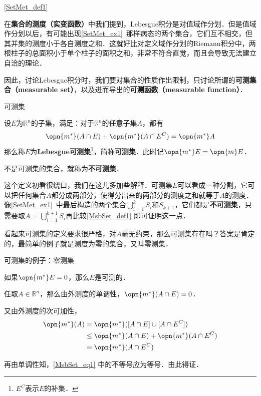 
\autoref{SetMet_def1} 

在\textbf{集合的测度（实变函数）}中我们提到，Lebesgue积分是对值域作分划．但是值域作分划以后，有可能出现\autoref{SetMet_ex1}~那样病态的两个集合，它们互不相交，但其并集的测度小于各自测度之和．这就好比对定义域作分划的Riemann积分中，两根柱子的总面积小于单个柱子的面积之和，非常不符合直觉，而且会导致无法建立自洽的理论．

因此，讨论Lebesgue积分时，我们要对集合的性质作出限制，只讨论所谓的\textbf{可测集合（measurable set）}，以及进而导出的\textbf{可测函数（measurable function）}．

\begin{definition}{可测集}\label{MsbSet_def1}

设$E$为$\mathbb{R}^n$的子集，满足：对于$\mathbb{R}^n$的任意子集$A$，都有
\begin{equation}
\opn{m^*}(A\cap E)+\opn{m^*}(A\cap E^C)=\opn{m^*}A
\end{equation}
那么称$E$为\textbf{Lebesgue可测集}\footnote{$E^C$表示$E$的补集．}，简称\textbf{可测集}．此时记$\opn{m^*}E=\opn{m}E$．

不是可测集的集合，就称为\textbf{不可测集}．

\end{definition}

这个定义初看很绕口，我们在这儿多加些解释．可测集$E$可以看成一种分割，它可以把任何集合$A$都分成两部分，使得分出来的两部分的测度之和就等于$A$的测度．像\autoref{SetMet_ex1}~中最后构造的两个集合$\bigcup_{i=1}^k S_i$和$S_{k+1}$，它们都是\textbf{不可测集}，只需要取$A=\bigcup^{k+1}_{i=1} S_i$再比较\autoref{MsbSet_def1} 即可证明这一点．

看起来可测集的定义要求很严格，对$A$毫无约束，那么可测集存在吗？答案是肯定的，最简单的例子就是测度为零的集合，又叫零测集．

\begin{example}{可测集的例子：零测集}

如果$\opn{m^*}E=0$，那么$E$是可测的．

任取$A\in\mathbb{R}^n$，那么由外测度的单调性，$\opn{m^*}(A\cap E)=0$．

又由外测度的次可加性，
\begin{equation}\label{MsbSet_eq1}
\begin{aligned}
\opn{m^*}(A)&=\opn{m^*}([A\cap E]\cup[A\cap E^C])\\
&\leq \opn{m^*}(A\cap E)+\opn{m^*}(A\cap E^C)\\
&=\opn{m^*}(A\cap E^C)
\end{aligned}
\end{equation}

再由单调性知，\autoref{MsbSet_eq1} 中的不等号应为等号．由此得证．

\end{example}

